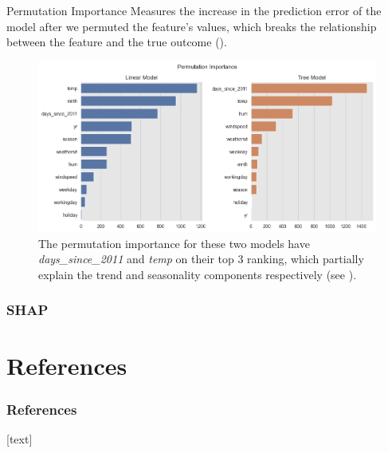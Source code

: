 \documentclass[10pt]{beamer}
\begin{document}
\begin{frame}{Permutation Importance}
Measures the increase in the prediction error of the model after we permuted the feature's values, which breaks the relationship between the feature and the true outcome (\cite[Section 5.5]{molnar2019}).
\begin{center}
  \begin{figure}
    \includegraphics[scale=0.35]{images/interpretable_ml_104_0.png}
    \caption{The permutation importance for these two models have {\em days\_since\_2011} and {\em temp} on their top 3 ranking, which partially explain the trend and seasonality components respectively (see \cite[Figure 5.30]{molnar2019}).}
  \end{figure}
\end{center}
\end{frame}

\subsubsection{SHAP}

\section{References}

\begin{frame}[t, allowframebreaks]
\frametitle{References}
\footnotesize{
[text]

 
}
\end{frame}
\end{document}
